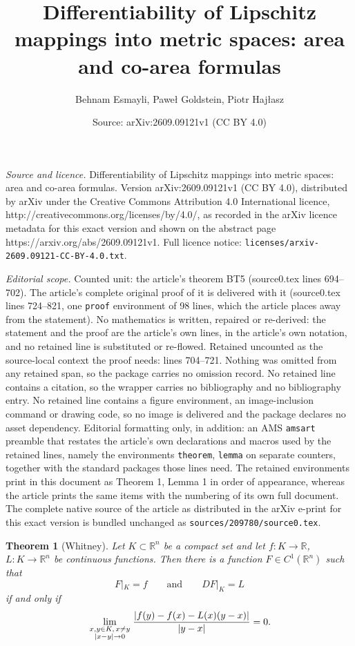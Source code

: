\documentclass[10pt,a4paper]{amsart}
\title{Differentiability of Lipschitz mappings into metric spaces: area and co-area formulas}
\author{Behnam Esmayli, Pawe\l{} Goldstein, Piotr Haj\l{}asz}
\date{Source: arXiv:2609.09121v1 (CC BY 4.0)}
\newtheorem{theorem}{Theorem}
\newcommand{\bbbr}{\mathbb R}
\begin{document}
\maketitle

\noindent\emph{Source and licence.} Differentiability of Lipschitz mappings into metric spaces: area and co-area formulas. Version arXiv:2609.09121v1 (CC BY 4.0), distributed by arXiv under the Creative Commons Attribution 4.0 International licence, http://creativecommons.org/licenses/by/4.0/, as recorded in the arXiv licence metadata for this exact version and shown on the abstract page https://arxiv.org/abs/2609.09121v1. Full licence notice: \texttt{licenses/arxiv-2609.09121-CC-BY-4.0.txt}.\par\smallskip

\noindent\textit{Editorial scope.} Counted unit: the article's theorem BT5 (source0.tex lines 694--702). The article's complete original proof of it is delivered with it (source0.tex lines 724--821, one \texttt{proof} environment of 98 lines, which the article places away from the statement). No mathematics is written, repaired or re-derived: the statement and the proof are the article's own lines, in the article's own notation, and no retained line is substituted or re-flowed.  Retained uncounted as the source-local context the proof needs: lines 704--721.  Nothing was omitted from any retained span, so the package carries no omission record.  No retained line contains a citation, so the wrapper carries no bibliography and no bibliography entry.  No retained line contains a figure environment, an image-inclusion command or drawing code, so no image is delivered and the package declares no asset dependency.  Editorial formatting only, in addition: an AMS \texttt{amsart} preamble that restates the article's own declarations and macros used by the retained lines, namely the environments \texttt{theorem}, \texttt{lemma} on separate counters, together with the standard packages those lines need.  The retained environments print in this document as Theorem 1, Lemma 1 in order of appearance, whereas the article prints the same items with the numbering of its own full document.  The complete native source of the article as distributed in the arXiv e-print for this exact version is bundled unchanged as \texttt{sources/209780/source0.tex}.
\begin{theorem}[Whitney]
\label{BT6}
Let $K\subset\bbbr^n$ be a compact set and let $f:K\to\bbbr$, $L:K\to\bbbr^n$
be continuous functions. Then there is a function $F\in C^1(\bbbr^n)$ such that
$$
F|_K=f
\qquad
\mbox{and}
\qquad
DF|_K=L
$$
if and only if
$$
\lim_{{\scriptstyle x,y\in K,\, x\neq y}\atop {\scriptstyle |x-y|\to 0}}
\frac{|f(y)-f(x)-L(x)(y-x)|}{|y-x|} = 0.
$$

\end{theorem}
\end{document}
